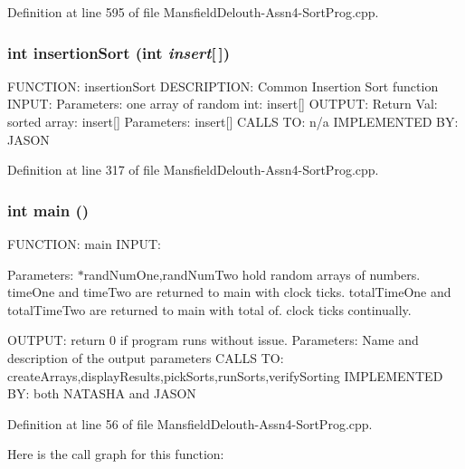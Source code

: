 Definition at line 595 of file MansfieldDelouth-\/Assn4-\/SortProg.cpp.

\hypertarget{_mansfield_delouth-_assn4-_sort_prog_8cpp_abdd451b9bf57eb321b817db4405d65fd}{
\subsubsection[{insertionSort}]{\setlength{\rightskip}{0pt plus 5cm}int insertionSort (int {\em insert}\mbox{[}$\,$\mbox{]})}}
\label{_mansfield_delouth-_assn4-_sort_prog_8cpp_abdd451b9bf57eb321b817db4405d65fd}
FUNCTION: insertionSort DESCRIPTION: Common Insertion Sort function INPUT: Parameters: one array of random int: insert\mbox{[}\mbox{]} OUTPUT: Return Val: sorted array: insert\mbox{[}\mbox{]} Parameters: insert\mbox{[}\mbox{]} CALLS TO: n/a IMPLEMENTED BY: JASON 

Definition at line 317 of file MansfieldDelouth-\/Assn4-\/SortProg.cpp.

\hypertarget{_mansfield_delouth-_assn4-_sort_prog_8cpp_ae66f6b31b5ad750f1fe042a706a4e3d4}{
\subsubsection[{main}]{\setlength{\rightskip}{0pt plus 5cm}int main ()}}
\label{_mansfield_delouth-_assn4-_sort_prog_8cpp_ae66f6b31b5ad750f1fe042a706a4e3d4}
FUNCTION: main INPUT:

Parameters: $\ast$randNumOne,randNumTwo hold random arrays of numbers. timeOne and timeTwo are returned to main with clock ticks. totalTimeOne and totalTimeTwo are returned to main with total of. clock ticks continually.

OUTPUT: return 0 if program runs without issue. Parameters: Name and description of the output parameters CALLS TO: createArrays,displayResults,pickSorts,runSorts,verifySorting IMPLEMENTED BY: both NATASHA and JASON 

Definition at line 56 of file MansfieldDelouth-\/Assn4-\/SortProg.cpp.



Here is the call graph for this function:

